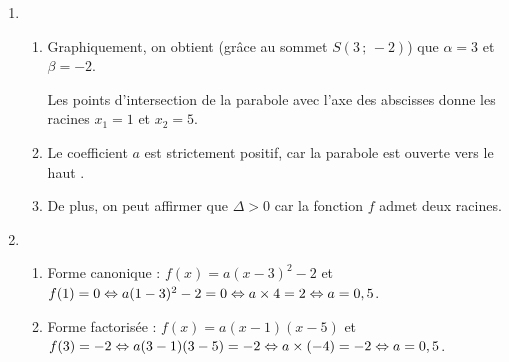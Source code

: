 \documentclass[a4paper,11pt]{article}
\begin{document}
\begin{enumerate}
	\item
	\begin{enumerate}
		\item Graphiquement, on obtient (grâce au sommet $S(3\,;\,-2)$) que $\alpha=3$ et $\beta=-2$. \hfill{}
		
		Les points d'intersection de la parabole avec l'axe des abscisses donne les racines $x_1=1$ et $x_2=5$.  \hfill{}
		\item Le coefficient $a$ est strictement positif, car la parabole est \og ouverte vers le haut \fg.
		\item De plus, on peut affirmer que $\Delta>0$ car la fonction $f$ admet deux racines.
	\end{enumerate}
	\item 
	\begin{enumerate}
		\item Forme canonique : $f(x)=a(x-3)^2-2$ et $f(1)=0 \Leftrightarrow a(1-3)^2-2=0 \Leftrightarrow a \times 4 = 2 \Leftrightarrow a=0,5$.
		\item Forme factorisée : $f(x)=a(x-1)(x-5)$ et $f(3)=-2 \Leftrightarrow a(3-1)(3-5)=-2 \Leftrightarrow a \times (-4)=-2 \Leftrightarrow a=0,5$.
	\end{enumerate}
\end{enumerate}

\medskip

\end{document}
